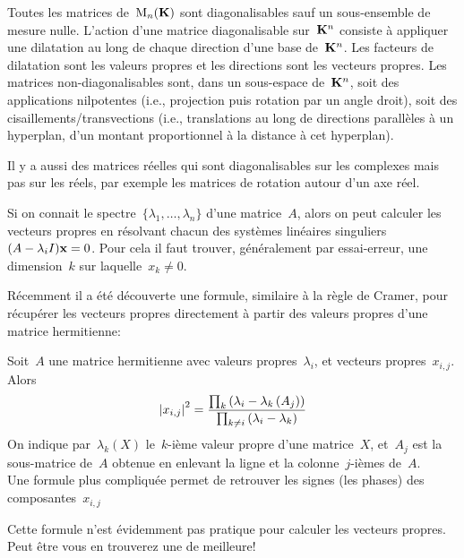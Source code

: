 \begin{proposition}
	Toutes les matrices de~$\mathrm{M}_n(\mathbf{K})$ sont diagonalisables sauf un
	sous-ensemble de mesure nulle.  L'action d'une matrice diagonalisable
	sur~$\mathbf{K}^n$ consiste à appliquer une dilatation au long de chaque direction
	d'une base de~$\mathbf{K}^n$.  Les facteurs de dilatation sont les
	valeurs propres et les directions sont les vecteurs
	propres.
	{\color{gray}
		Les matrices non-diagonalisables sont, dans un sous-espace
		de~$\mathbf{K}^n$, soit des applications nilpotentes (i.e., projection puis
		rotation par un angle droit), soit des cisaillements/transvections
		(i.e., translations au long de directions parallèles à un hyperplan, d'un
		montant proportionnel à la distance à cet hyperplan).
	}
\end{proposition}

Il y a aussi des matrices réelles qui sont diagonalisables sur les complexes
mais pas sur les réels, par exemple les matrices de rotation autour d'un axe
réel.

Si on connait le spectre~$\{\lambda_1,\ldots,\lambda_n\}$ d'une matrice~$A$,
alors on peut calculer les vecteurs propres en résolvant chacun des systèmes
linéaires singuliers~$(A-\lambda_i I)\mathbf{x}=0$.  Pour cela il faut trouver,
généralement par essai-erreur, une dimension~$k$ sur laquelle~$x_k\neq0$.

Récemment il a été découverte une formule, similaire à la règle de Cramer,
pour récupérer les vecteurs propres directement à partir des valeurs propres
d'une matrice hermitienne:

\begin{theorem}
	Soit~$A$ une matrice hermitienne avec valeurs
	propres~$\lambda_i$, et vecteurs propres~$x_{i,j}$.  Alors
	\[
		\left|x_{i,j}\right|^2
		=
		\frac
		{\prod_k\left(\lambda_i-\lambda_k\left(A_j\right)\right)}
		{\prod_{k\neq i}\left(\lambda_i-\lambda_k\right)}
	\]
	On indique par~$\lambda_k(X)$ le~$k$-ième valeur propre d'une matrice~$X$,
	et~$A_j$ est la sous-matrice de~$A$ obtenue en enlevant la ligne et la
	colonne~$j$-ièmes de~$A$.\\
	Une formule plus compliquée permet de retrouver les signes (les
	phases) des composantes~$x_{i,j}$
\end{theorem}

Cette formule n'est évidemment pas pratique pour calculer les vecteurs
propres.  Peut être vous en trouverez une de meilleure!

